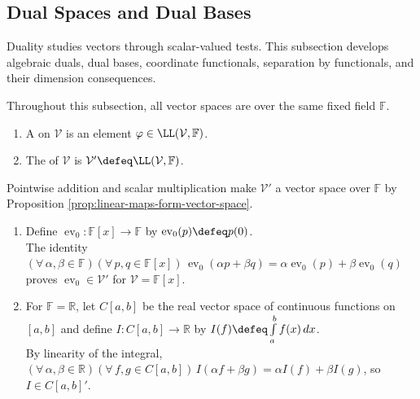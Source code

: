 \subsection{Dual Spaces and Dual Bases}
%

Duality studies vectors through scalar-valued tests. This subsection develops algebraic duals, dual bases, coordinate functionals, separation by functionals, and their dimension consequences.

Throughout this subsection, all vector spaces are over the same fixed field $\mathbb{F}$.

\begin{definition} \label{def:linear-functional-and-dual-space} 
\begin{enumerate}[label=(\roman*)]
\setlength{\itemsep}{0pt}
\item A  on $\mathcal{V}$ is an element $\varphi\in\LL(\mathcal{V},\mathbb{F})$.
\item The  of $\mathcal{V}$ is $\mathcal{V}'\defeq\LL(\mathcal{V},\mathbb{F})$.
\end{enumerate}
Pointwise addition and scalar multiplication make $\mathcal{V}'$ a vector space over $\mathbb{F}$ by Proposition \ref{prop:linear-maps-form-vector-space}.
\end{definition}

\begin{example} \label{ex:evaluation-and-integral-functionals} 
\begin{enumerate}[label=(\roman*)]
\setlength{\itemsep}{0pt}
\item Define $\operatorname{ev}_0:\mathbb{F}[x]\to\mathbb{F}$ by $\operatorname{ev}_0(p)\defeq p(0)$.\\
The identity $(\forall\,\alpha,\beta\in\mathbb{F})(\forall\,p,q\in\mathbb{F}[x])\,\operatorname{ev}_0(\alpha p+\beta q)=\alpha\operatorname{ev}_0(p)+\beta\operatorname{ev}_0(q)$ proves $\operatorname{ev}_0\in\mathcal{V}'$ for $\mathcal{V}=\mathbb{F}[x]$.
\item For $\mathbb{F}=\mathbb{R}$, let $C[a,b]$ be the real vector space of continuous functions on $[a,b]$ and define $I:C[a,b]\to\mathbb{R}$ by $I(f)\defeq\int\limits_a^b f(x)\,dx$.\\
By linearity of the integral, $(\forall\,\alpha,\beta\in\mathbb{R})(\forall\,f,g\in C[a,b])\,I(\alpha f+\beta g)=\alpha I(f)+\beta I(g)$, so $I\in C[a,b]'$.
\end{enumerate}
\end{example}


